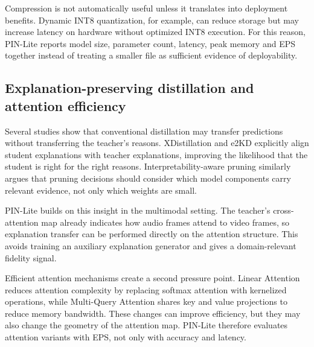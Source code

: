 \documentclass[pdflatex,sn-basic,Numbered]{sn-jnl}
\begin{document}
Compression is not automatically useful unless it translates into deployment benefits. Dynamic INT8 quantization, for example, can reduce storage but may increase latency on hardware without optimized INT8 execution. For this reason, PIN-Lite reports model size, parameter count, latency, peak memory and EPS together instead of treating a smaller file as sufficient evidence of deployability.

\subsection{Explanation-preserving distillation and attention efficiency}\label{subsec:explanation}

Several studies show that conventional distillation may transfer predictions without transferring the teacher's reasons. XDistillation \cite{alharbi2021xdistillation} and e2KD \cite{parchami2024e2kd} explicitly align student explanations with teacher explanations, improving the likelihood that the student is right for the right reasons. Interpretability-aware pruning \cite{malik2025pruning} similarly argues that pruning decisions should consider which model components carry relevant evidence, not only which weights are small.

PIN-Lite builds on this insight in the multimodal setting. The teacher's cross-attention map already indicates how audio frames attend to video frames, so explanation transfer can be performed directly on the attention structure. This avoids training an auxiliary explanation generator and gives a domain-relevant fidelity signal.

Efficient attention mechanisms create a second pressure point. Linear Attention \cite{katharopoulos2020linear} reduces attention complexity by replacing softmax attention with kernelized operations, while Multi-Query Attention \cite{shazeer2019mqa} shares key and value projections to reduce memory bandwidth. These changes can improve efficiency, but they may also change the geometry of the attention map. PIN-Lite therefore evaluates attention variants with EPS, not only with accuracy and latency.
\end{document}

